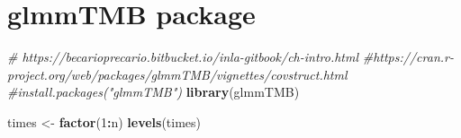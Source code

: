 \documentclass[]{book}
\newenvironment{Shaded}{\begin{snugshade}}{\end{snugshade}}
\newcommand{\KeywordTok}[1]{\textcolor[rgb]{0.13,0.29,0.53}{\textbf{#1}}}
\newcommand{\DecValTok}[1]{\textcolor[rgb]{0.00,0.00,0.81}{#1}}
\newcommand{\StringTok}[1]{\textcolor[rgb]{0.31,0.60,0.02}{#1}}
\newcommand{\CommentTok}[1]{\textcolor[rgb]{0.56,0.35,0.01}{\textit{#1}}}
\newcommand{\OperatorTok}[1]{\textcolor[rgb]{0.81,0.36,0.00}{\textbf{#1}}}
\newcommand{\NormalTok}[1]{#1}
\begin{document}
\section{glmmTMB package}\label{glmmtmb-package}

\begin{Shaded}
\begin{Highlighting}[]
\CommentTok{# https://becarioprecario.bitbucket.io/inla-gitbook/ch-intro.html}
\CommentTok{#https://cran.r-project.org/web/packages/glmmTMB/vignettes/covstruct.html}
\CommentTok{#install.packages("glmmTMB")}
\KeywordTok{library}\NormalTok{(glmmTMB)}

\NormalTok{times <-}\StringTok{ }\KeywordTok{factor}\NormalTok{(}\DecValTok{1}\OperatorTok{:}\NormalTok{n)}
\KeywordTok{levels}\NormalTok{(times)}
\end{Highlighting}
\end{Shaded}
\end{document}
